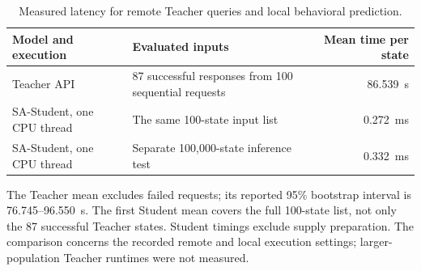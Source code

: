 \begin{table}[pos=htbp]
\centering\small
\caption{Measured latency for remote Teacher queries and local behavioral prediction.}
\label{tab:inference_motivation}
\setlength{\tabcolsep}{4pt}
\begin{tabularx}{\linewidth}{@{}lXr@{}}
\toprule
Model and execution & Evaluated inputs & Mean time per state \\
\midrule
Teacher API & 87 successful responses from 100 sequential requests & 86.539~s \\
SA-Student, one CPU thread & The same 100-state input list & 0.272~ms \\
SA-Student, one CPU thread & Separate 100,000-state inference test & 0.332~ms \\
\bottomrule
\end{tabularx}
\par\smallskip\begin{minipage}{\linewidth}\footnotesize
The Teacher mean excludes failed requests; its reported 95\% bootstrap interval is 76.745--96.550~s. The first Student mean covers the full 100-state list, not only the 87 successful Teacher states. Student timings exclude supply preparation. The comparison concerns the recorded remote and local execution settings; larger-population Teacher runtimes were not measured.
\end{minipage}
\end{table}
